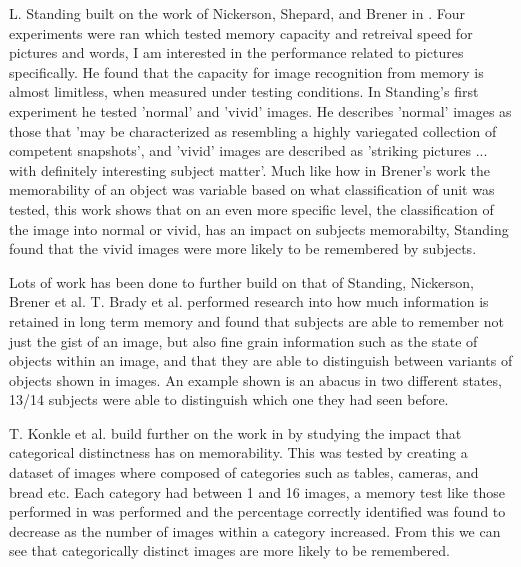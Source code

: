 \documentclass{UoYCSproject}
\begin{document}
L. Standing built on the work of Nickerson, Shepard, and Brener in \cite{standing10000pictures}. Four experiments were ran which tested memory capacity and retreival speed for pictures and words, I am interested in the performance related to pictures specifically. He found that the capacity for image recognition from memory is almost limitless, when measured under testing conditions. In Standing's first experiment he tested 'normal' and 'vivid' images. He describes 'normal' images as those that 'may be characterized as resembling a highly variegated collection of competent snapshots'\cite[p.208]{standing10000pictures}, and 'vivid' images are described as 'striking pictures ... with definitely interesting subject matter'\cite[p.208]{standing10000pictures}. Much like how in Brener's work \cite{BrenerMemorySpan} the memorability of an object was variable based on what classification of unit was tested, this work shows that on an even more specific level, the classification of the image into normal or vivid, has an impact on subjects memorabilty, Standing found that the vivid images were more likely to be remembered by subjects.

Lots of work has been done to further build on that of Standing, Nickerson, Brener et al. T. Brady et al. \cite{brady2008visual} performed research into how much information is retained in long term memory and found that subjects are able to remember not just the gist of an image, but also fine grain information such as the state of objects within an image, and that they are able to distinguish between variants of objects shown in images. An example shown is an abacus in two different states, 13/14 subjects were able to distinguish which one they had seen before.


T. Konkle et al. build further on the work in \cite{standing10000pictures, brady2008visual} by studying the impact that categorical distinctness has on memorability. This was tested by creating a dataset of images where composed of categories such as tables, cameras, and bread etc. Each category had between 1 and 16 images, a memory test like those performed in \cite{standing10000pictures, brady2008visual}
was performed and the percentage correctly identified was found to decrease as the number of images within a category increased. From this we can see that categorically distinct images are more likely to be remembered. 
\end{document}
